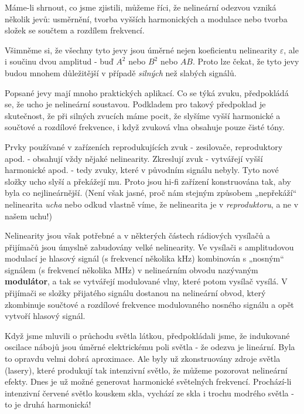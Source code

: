   Máme-li shrnout, co jsme zjistili, můžeme říci, že nelineární odezvou vzniká několik jevů: 
  usměrnění, tvorba vyšších harmonických a modulace nebo tvorba složek se součtem a rozdílem 
  frekvencí. 
  
  Všimněme si, že všechny tyto jevy jsou úměrné nejen koeficientu nelinearity \(\varepsilon\), ale 
  i součinu dvou amplitud - buď \(A^2\) nebo \(B^2\) nebo \(AB\). Proto lze čekat, že tyto jevy 
  budou mnohem důležitější v případě \emph{silných} než slabých signálů. 
  
  Popsané jevy mají mnoho praktických aplikací. Co se týká zvuku, předpokládá se, že ucho je 
  nelineární soustavou. Podkladem pro takový předpoklad je skutečnost, že při silných zvucích máme 
  pocit, že slyšíme vyšší harmonické a součtové a rozdílové frekvence, i když zvuková vlna obsahuje 
  pouze čisté tóny.
  
  Prvky používané v zařízeních reprodukujících zvuk - zesilovače, reproduktory apod. - obsahují 
  vždy nějaké nelinearity. Zkreslují zvuk - vytvářejí vyšší harmonické apod. - tedy zvuky, které v 
  původním signálu nebyly. Tyto nové složky ucho slyší a překážejí mu. Proto jsou hi-fi zařízení 
  konstruována tak, aby byla co nejlineárnější. (Není však jasné, proč nám stejným způsobem 
  „nepřekáží“ nelinearita \emph{ucha} nebo odkud vlastně víme, že nelinearita je v 
  \emph{reproduktoru}, a ne v našem uchu!)
  
  Nelinearity jsou však potřebné a v některých částech rádiových vysílačů a přijímačů jsou úmyslně 
  zabudovány velké nelinearity. Ve vysílači s amplitudovou modulací je hlasový signál (s frekvencí 
  několika kHz) kombinován s „nosným“ signálem (s frekvencí několika MHz) v nelineárním obvodu 
  nazývaným \textbf{modulátor}, a tak se vytvářejí modulované vlny, které potom vysílač vysílá. V 
  přijímači se složky přijatého signálu dostanou na nelineární obvod, který zkombinuje součtové a 
  rozdílové frekvence modulovaného nosného signálu a opět vytvoří hlasový signál.
  
  Když jsme mluvili o průchodu světla látkou, předpokládali jsme, že indukované oscilace nábojů 
  jsou úměrné elektrickému poli světla - že odezva je lineární. Byla to opravdu velmi dobrá 
  aproximace. Ale byly už zkonstruovány zdroje světla (lasery), které produkují tak intenzivní 
  světlo, že můžeme pozorovat nelineární efekty. Dnes je už možné generovat harmonické světelných 
  frekvencí. Prochází-li intenzivní červené světlo kouskem skla, vychází ze skla i trochu modrého 
  světla - to je druhá harmonická!
  

